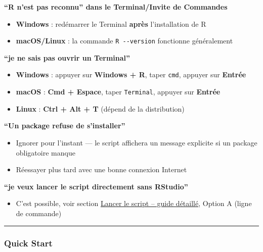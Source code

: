 \textbf{``R n'est pas reconnu'' dans le Terminal/Invite de Commandes}

\begin{itemize}
\tightlist
\item
  \textbf{Windows} : redémarrer le Terminal \textbf{après}
  l'installation de R
\item
  \textbf{macOS/Linux} : la commande \texttt{R\ -\/-version} fonctionne
  généralement
\end{itemize}

\textbf{``je ne sais pas ouvrir un Terminal''}

\begin{itemize}
\tightlist
\item
  \textbf{Windows} : appuyer sur \textbf{Windows + R}, taper
  \texttt{cmd}, appuyer sur \textbf{Entrée}
\item
  \textbf{macOS} : \textbf{Cmd + Espace}, taper \texttt{Terminal},
  appuyer sur \textbf{Entrée}
\item
  \textbf{Linux} : \textbf{Ctrl + Alt + T} (dépend de la distribution)
\end{itemize}

\textbf{``Un package refuse de s'installer''}

\begin{itemize}
\tightlist
\item
  Ignorer pour l'instant --- le script affichera un message explicite si
  un package obligatoire manque
\item
  Réessayer plus tard avec une bonne connexion Internet
\end{itemize}

\textbf{``je veux lancer le script directement sans RStudio''}

\begin{itemize}
\tightlist
\item
  C'est possible, voir section
  \hyperref[ux5cux25EFux5cux25B8ux5cux258F-lancer-le-script--guide-dux5cux25C3ux5cux25A9taillux5cux25C3ux5cux25A9]{Lancer
  le script -- guide détaillé}, Option A (ligne de commande)
\end{itemize}

\begin{center}\rule{0.5\linewidth}{0.5pt}\end{center}

\subsubsection{Quick Start}\label{quick-start}

